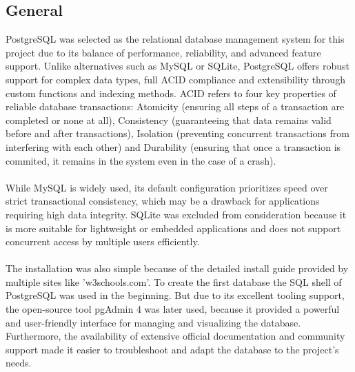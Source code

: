 \documentclass[a4paper,12pt]{report}
\begin{document}
\subsection{General}
PostgreSQL was selected as the relational database management system for this project due to its balance of performance, reliability, and advanced feature support. Unlike alternatives such as MySQL or SQLite, PostgreSQL offers robust support for complex data types, full ACID compliance and extensibility through custom functions and indexing methods. ACID refers to four key properties of reliable database transactions: Atomicity (ensuring all steps of a transaction are completed or none at all), Consistency (guaranteeing that data remains valid before and after transactions), Isolation (preventing concurrent transactions from interfering with each other) and Durability (ensuring that once a transaction is commited, it remains in the system even in the case of a crash). \parencite{postgresdocs} \parencite{acid}\\\\
While MySQL is widely used, its default configuration prioritizes speed over strict transactional consistency, which may be a drawback for applications requiring high data integrity. SQLite was excluded from consideration because it is more suitable for lightweight or embedded applications and does not support concurrent access by multiple users efficiently. \parencite{postgresvsMysql}\\\\
The installation was also simple because of the detailed install guide provided by multiple sites like 'w3schools.com'. To create the first database the SQL shell of PostgreSQL was used in the beginning. But due to its excellent tooling support, the open-source tool pgAdmin 4 was later used, because it  provided a powerful and user-friendly interface for managing and visualizing the database. Furthermore, the availability of extensive official documentation and community support made it easier to troubleshoot and adapt the database to the project’s needs. \parencite{pgAdmin} \parencite{pgsinstallation} \\
\end{document}

